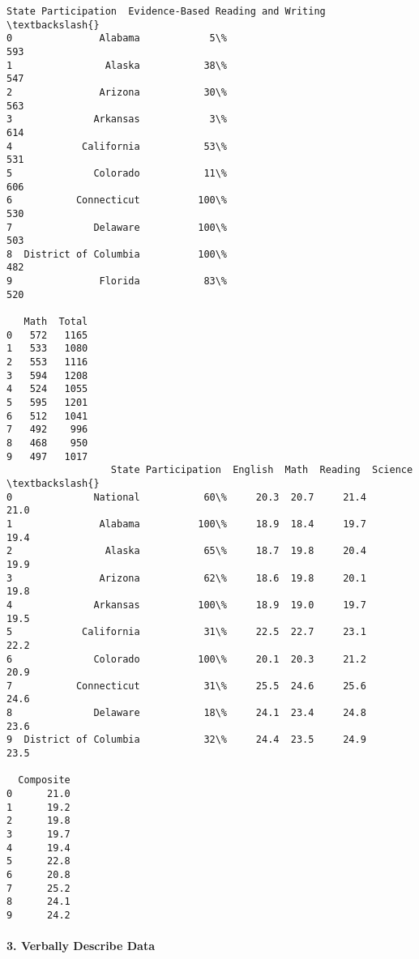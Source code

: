 \documentclass[11pt]{article}
\begin{document}
    \begin{Verbatim}[commandchars=\\\{\}]
                  State Participation  Evidence-Based Reading and Writing  \textbackslash{}
0               Alabama            5\%                                 593   
1                Alaska           38\%                                 547   
2               Arizona           30\%                                 563   
3              Arkansas            3\%                                 614   
4            California           53\%                                 531   
5              Colorado           11\%                                 606   
6           Connecticut          100\%                                 530   
7              Delaware          100\%                                 503   
8  District of Columbia          100\%                                 482   
9               Florida           83\%                                 520   

   Math  Total  
0   572   1165  
1   533   1080  
2   553   1116  
3   594   1208  
4   524   1055  
5   595   1201  
6   512   1041  
7   492    996  
8   468    950  
9   497   1017  
                  State Participation  English  Math  Reading  Science  \textbackslash{}
0              National           60\%     20.3  20.7     21.4     21.0   
1               Alabama          100\%     18.9  18.4     19.7     19.4   
2                Alaska           65\%     18.7  19.8     20.4     19.9   
3               Arizona           62\%     18.6  19.8     20.1     19.8   
4              Arkansas          100\%     18.9  19.0     19.7     19.5   
5            California           31\%     22.5  22.7     23.1     22.2   
6              Colorado          100\%     20.1  20.3     21.2     20.9   
7           Connecticut           31\%     25.5  24.6     25.6     24.6   
8              Delaware           18\%     24.1  23.4     24.8     23.6   
9  District of Columbia           32\%     24.4  23.5     24.9     23.5   

  Composite  
0      21.0  
1      19.2  
2      19.8  
3      19.7  
4      19.4  
5      22.8  
6      20.8  
7      25.2  
8      24.1  
9      24.2  

    \end{Verbatim}

    \paragraph{3. Verbally Describe Data}\label{verbally-describe-data}
\end{document}
